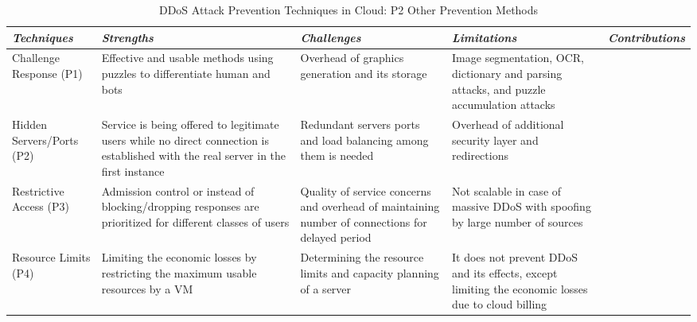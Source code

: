 \documentclass[final,5p,times,twocolumn]{elsarticle}
\begin{document}
\begin{table*}
\begin{center}
\centering
{
\begin{tabular}{|l|l|l|l|l|}\hline
{\it \bf  Techniques}	&	{\it \bf Strengths }	& 	{\it \bf Challenges} 			& {\it \bf Limitations} & {\it \bf Contributions}\\ \hline
 \parbox{2cm}{Challenge\\ Response (P1)}  		& \parbox{3.5cm}{Effective and usable  methods using puzzles to differentiate human and bots}  & \parbox{3.5cm}{ Overhead of graphics generation and its storage}  &  \parbox{3.5cm}{Image segmentation, OCR, dictionary and parsing attacks, and puzzle accumulation attacks} &  \parbox{2cm}{\cite{spow}\cite{scrubber}\cite{enhanced} \cite{edosshield}\cite{alosaimi}\cite{moving} \cite{comber}\cite{capabilities}}\\\hline

 \parbox{2cm}{Hidden Servers/Ports (P2)}  		& \parbox{3.5cm}{Service is being offered to legitimate users while no direct connection is established with the real server in the first instance}  & \parbox{3.5cm}{Redundant servers ports and load balancing among them is needed}  &  \parbox{3.5cm}{Overhead of additional security layer and redirections} &  \parbox{2cm}{ \cite{moving}\cite{spow}\cite{edosarmor} \cite{jia2014catch}\cite{army} }\\\hline
 
 \parbox{2cm}{Restrictive Access (P3)}  		& \parbox{3.5cm}{ Admission control or instead of blocking/dropping responses are prioritized for different classes of users}  & \parbox{3.5cm}{Quality of service concerns and overhead of maintaining number of connections for  delayed period}  &  \parbox{3.5cm}{Not scalable in case of massive DDoS with spoofing by large number of sources} &  \parbox{2cm}{ \cite{baig}\cite{index}\cite{spow} \cite{edosarmor} }\\\hline
 
\parbox{2cm}{Resource Limits (P4)}  		& \parbox{3.5cm}{ Limiting the economic losses by restricting the maximum usable resources by a VM}  & \parbox{3.5cm}{Determining the resource limits and capacity planning of  a server}  &  \parbox{3.5cm}{It does not prevent DDoS and its effects, except  limiting the economic losses due to cloud billing } &  \parbox{2cm}{\cite{Cloudwatch}\cite{amazondiscussionforum}\cite{awsddosprotection}  }\\\hline
\end{tabular}
}\end{center}
\caption{{DDoS Attack Prevention Techniques in Cloud: P2 Other Prevention Methods}}
\label{P1}
\end{table*}
\end{document}
